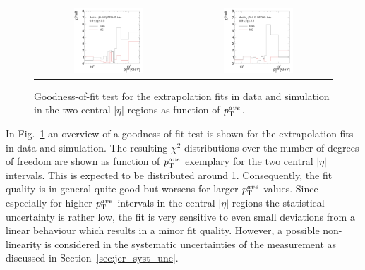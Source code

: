 \begin{figure}[!tp]
  \centering
  \begin{tabular}{cc}
                \includegraphics[width=0.49\textwidth]{figures/GoodnessOfFit_Eta0_final_nominal_v4.pdf} &
                \includegraphics[width=0.49\textwidth]{figures/GoodnessOfFit_Eta1_final_nominal_v4.pdf} \\
  \end{tabular}
  \caption{Goodness-of-fit test for the extrapolation fits in data and simulation in the two central $|\eta|$ regions as function of $p_{\text{T}}^{ave}$.}
  \label{fig:goodness-of-fit}
\end{figure}

In Fig.~\ref{fig:goodness-of-fit} an overview of a goodness-of-fit test is shown for the extrapolation fits in data and simulation. The resulting $\chi^2$ distributions over the number of degrees of freedom are shown as function of $p_{\text{T}}^{ave}$ exemplary for the two central $|\eta|$ intervals. This is expected to be distributed around 1. Consequently, the fit quality is in general quite good but worsens for larger $p_{\text{T}}^{ave}$ values. Since especially for higher $p_{\text{T}}^{ave}$ intervals in the central $|\eta|$ regions the statistical uncertainty is rather low, the fit is very sensitive to even small deviations from a linear behaviour which results in a minor fit quality. However, a possible non-linearity is considered in the systematic uncertainties of the measurement as discussed in Section~\ref{sec:jer_syst_unc}.

